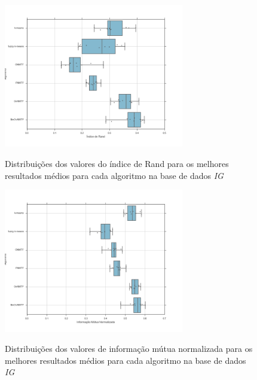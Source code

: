 \documentclass[
    12pt,                %
    oneside,            %
    a4paper,            %
    english,            %
    brazil                %
    ]{abntex2ppgsi}
\begin{document}
\begin{figure}[H]
    \centering
    \caption{Distribuições dos valores do índice de Rand para os melhores resultados médios para cada algoritmo na base de dados \textit{IG}}
    \includegraphics[width=0.7\textwidth]{img/boxplot-rand-ig.png}
    \label{fig:boxplot-rand:ig}
\end{figure}

\begin{figure}[H]
    \centering
    \caption{Distribuições dos valores de informação mútua normalizada para os melhores resultados médios para cada algoritmo na base de dados \textit{IG}}
    \includegraphics[width=0.7\textwidth]{img/boxplot-nmi-ig.png}
    \label{fig:boxplot-nmi:ig}
\end{figure}
\end{document}
